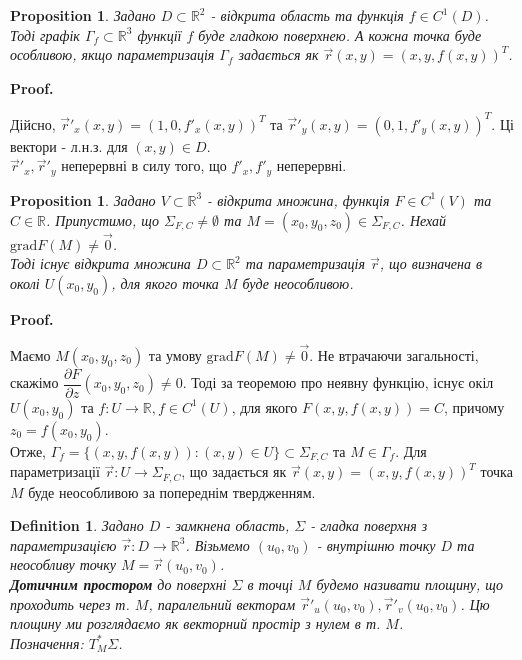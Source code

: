 \documentclass[a4paper, 10pt]{article}
\makeatletter
\def\departial#1#2{\dfrac{\partial {#1}}{\partial {#2}}}
\def\qed{$\blacksquare$}
\theoremstyle{theoremdd}
\theoremstyle{theoremdd}
\newtheorem{definition}[theorem]{Definition}
\theoremstyle{theoremdd}
\theoremstyle{theoremdd}
\theoremstyle{theoremdd}
\theoremstyle{theoremdd}
\theoremstyle{theoremdd}
\theoremstyle{theoremdd}
\theoremstyle{theoremdd}
\newtheorem{proposition}[theorem]{Proposition}
\theoremstyle{theoremdd}
\theoremstyle{theoremdd}
\theoremstyle{theoremdd}
\theoremstyle{theoremdd}
\theoremstyle{theoremdd}
\theoremstyle{theoremdd}
\renewenvironment{proof}[1][Proof.\\]{\par
\pushQED{\hfill \qed}%
\normalfont \topsep6\p@\@plus6\p@\relax
\trivlist
\item\relax
{\bfseries
#1\@addpunct{.}}\hspace\labelsep\ignorespaces
}{%
\popQED\endtrivlist\@endpefalse
}
\makeatother
\begin{document}
\begin{proposition}
Задано $D \subset \mathbb{R}^2$ - відкрита область та функція $f \in C^1(D)$. Тоді графік $\Gamma_f \subset \mathbb{R}^3$ функції $f$ буде гладкою поверхнею. А кожна точка буде особливою, якщо параметризація $\Gamma_f$ задається як $\vec{r}(x,y) = (x,y,f(x,y))^T$.
\end{proposition}

\begin{proof}
Дійсно, $\vec{r}'_x(x,y) = (1,0,f'_x(x,y))^T$ та $\vec{r}'_y(x,y) = (0,1,f'_y(x,y))^T$. Ці вектори - л.н.з. для $(x,y) \in D$.\\
$\vec{r}'_x, \vec{r}'_y$ неперервні в силу того, що $f'_x,f'_y$ неперервні.
\end{proof}

\begin{proposition}
Задано $V \subset \mathbb{R}^3$ - відкрита множина, функція $F \in C^1(V)$ та $C \in \mathbb{R}$. Припустимо, що $\Sigma_{F,C} \neq \emptyset$ та $M =(x_0,y_0,z_0) \in \Sigma_{F,C}$. Нехай $\text{grad} F(M) \neq \vec{0}$. \\
Тоді існує відкрита множина $D \subset \mathbb{R}^2$ та параметризація $\vec{r}$, що визначена в околі $U(x_0,y_0)$, для якого точка $M$ буде неособливою.
\end{proposition}

\begin{proof}
Маємо $M(x_0,y_0,z_0)$ та умову $\text{grad} F(M) \neq \vec{0}$. Не втрачаючи загальності, скажімо $\departial{F}{z}(x_0,y_0,z_0) \neq 0$. Тоді за теоремою про неявну функцію, існує окіл $U(x_0,y_0)$ та $f: U \to \mathbb{R}, f \in C^1(U)$, для якого $F(x,y,f(x,y)) = C$, причому $z_0 = f(x_0,y_0)$.\\
Отже, $\Gamma_f = \{(x,y,f(x,y)) : (x,y) \in U\} \subset \Sigma_{F,C}$ та $M \in \Gamma_f$. Для параметризації $\vec{r}: U \to \Sigma_{F,C}$, що задається як $\vec{r}(x,y) = (x,y,f(x,y))^T$ точка $M$ буде неособливою за попереднім твердженням.
\end{proof}

\begin{definition}
Задано $D$ - замкнена область, $\Sigma$ - гладка поверхня з параметризацією $\vec{r}: D \to \mathbb{R}^3$. Візьмемо $(u_0,v_0)$ - внутрішню точку $D$ та неособливу точку $M = \vec{r}(u_0,v_0)$.\\
\textbf{Дотичним простором} до поверхні $\Sigma$ в точці $M$ будемо називати площину, що проходить через т. $M$, паралельний векторам $\vec{r}'_u(u_0,v_0), \vec{r}'_v(u_0,v_0)$. Цю площину ми розглядаємо як векторний простір з нулем в т. $M$.\\
Позначення: $T^*_M \Sigma$.
\end{definition}
\end{document}
